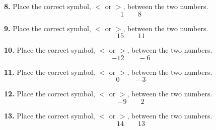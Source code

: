 \documentclass{ximera}
\begin{document}
\begin{problem}
\textbf{8.} Place the correct symbol, $<$ or $>$, between the two numbers.
\[
1 \qquad 8
\]

\begin{multipleChoice}
\end{multipleChoice}
\end{problem}

\begin{problem}
\textbf{9.} Place the correct symbol, $<$ or $>$, between the two numbers.
\[
15 \qquad 11
\]

\begin{multipleChoice}
\end{multipleChoice}
\end{problem}

\begin{problem}
\textbf{10.} Place the correct symbol, $<$ or $>$, between the two numbers.
\[
-12 \qquad -6
\]

\begin{multipleChoice}
\end{multipleChoice}
\end{problem}

\begin{problem}
\textbf{11.} Place the correct symbol, $<$ or $>$, between the two numbers.
\[
0 \qquad -3
\]

\begin{multipleChoice}
\end{multipleChoice}
\end{problem}

\begin{problem}
\textbf{12.} Place the correct symbol, $<$ or $>$, between the two numbers.
\[
-9 \qquad 2
\]

\begin{multipleChoice}
\end{multipleChoice}
\end{problem}

\begin{problem}
\textbf{13.} Place the correct symbol, $<$ or $>$, between the two numbers.
\[
14 \qquad 13
\]

\begin{multipleChoice}
\end{multipleChoice}
\end{problem}
\end{document}
